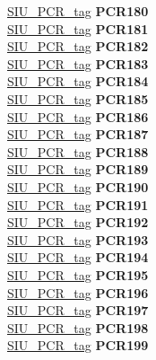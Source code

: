 \begin{DoxyCompactItemize}
\begin{tabbing}
\>\>\mbox{\hyperlink{unionSIU__tag_1_1SIU__PCR__tag}{SIU\_PCR\_tag}} {\bfseries PCR180}\\
\>\>\mbox{\hyperlink{unionSIU__tag_1_1SIU__PCR__tag}{SIU\_PCR\_tag}} {\bfseries PCR181}\\
\>\>\mbox{\hyperlink{unionSIU__tag_1_1SIU__PCR__tag}{SIU\_PCR\_tag}} {\bfseries PCR182}\\
\>\>\mbox{\hyperlink{unionSIU__tag_1_1SIU__PCR__tag}{SIU\_PCR\_tag}} {\bfseries PCR183}\\
\>\>\mbox{\hyperlink{unionSIU__tag_1_1SIU__PCR__tag}{SIU\_PCR\_tag}} {\bfseries PCR184}\\
\>\>\mbox{\hyperlink{unionSIU__tag_1_1SIU__PCR__tag}{SIU\_PCR\_tag}} {\bfseries PCR185}\\
\>\>\mbox{\hyperlink{unionSIU__tag_1_1SIU__PCR__tag}{SIU\_PCR\_tag}} {\bfseries PCR186}\\
\>\>\mbox{\hyperlink{unionSIU__tag_1_1SIU__PCR__tag}{SIU\_PCR\_tag}} {\bfseries PCR187}\\
\>\>\mbox{\hyperlink{unionSIU__tag_1_1SIU__PCR__tag}{SIU\_PCR\_tag}} {\bfseries PCR188}\\
\>\>\mbox{\hyperlink{unionSIU__tag_1_1SIU__PCR__tag}{SIU\_PCR\_tag}} {\bfseries PCR189}\\
\>\>\mbox{\hyperlink{unionSIU__tag_1_1SIU__PCR__tag}{SIU\_PCR\_tag}} {\bfseries PCR190}\\
\>\>\mbox{\hyperlink{unionSIU__tag_1_1SIU__PCR__tag}{SIU\_PCR\_tag}} {\bfseries PCR191}\\
\>\>\mbox{\hyperlink{unionSIU__tag_1_1SIU__PCR__tag}{SIU\_PCR\_tag}} {\bfseries PCR192}\\
\>\>\mbox{\hyperlink{unionSIU__tag_1_1SIU__PCR__tag}{SIU\_PCR\_tag}} {\bfseries PCR193}\\
\>\>\mbox{\hyperlink{unionSIU__tag_1_1SIU__PCR__tag}{SIU\_PCR\_tag}} {\bfseries PCR194}\\
\>\>\mbox{\hyperlink{unionSIU__tag_1_1SIU__PCR__tag}{SIU\_PCR\_tag}} {\bfseries PCR195}\\
\>\>\mbox{\hyperlink{unionSIU__tag_1_1SIU__PCR__tag}{SIU\_PCR\_tag}} {\bfseries PCR196}\\
\>\>\mbox{\hyperlink{unionSIU__tag_1_1SIU__PCR__tag}{SIU\_PCR\_tag}} {\bfseries PCR197}\\
\>\>\mbox{\hyperlink{unionSIU__tag_1_1SIU__PCR__tag}{SIU\_PCR\_tag}} {\bfseries PCR198}\\
\>\>\mbox{\hyperlink{unionSIU__tag_1_1SIU__PCR__tag}{SIU\_PCR\_tag}} {\bfseries PCR199}\\

\end{tabbing}
\end{DoxyCompactItemize}
